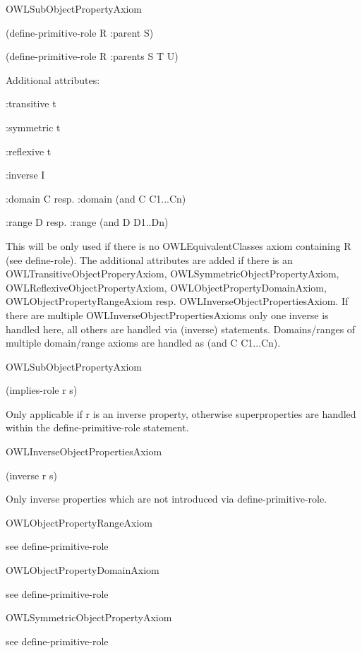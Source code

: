 O\-W\-L\-Sub\-Object\-Property\-Axiom 

(define-\/primitive-\/role R \-:parent S)

(define-\/primitive-\/role R \-:parents S T U)

Additional attributes\-: 
\begin{DoxyItemize}
\item \-:transitive t 
\item \-:symmetric t 
\item \-:reflexive t 
\item \-:inverse I 
\item \-:domain C resp. \-:domain (and C C1...Cn) 
\item \-:range D resp. \-:range (and D D1..Dn) 
\end{DoxyItemize}

This will be only used if there is no O\-W\-L\-Equivalent\-Classes axiom containing R (see define-\/role). The additional attributes are added if there is an O\-W\-L\-Transitive\-Object\-Propery\-Axiom, O\-W\-L\-Symmetric\-Object\-Property\-Axiom, O\-W\-L\-Reflexive\-Object\-Property\-Axiom, O\-W\-L\-Object\-Property\-Domain\-Axiom, O\-W\-L\-Object\-Property\-Range\-Axiom resp. O\-W\-L\-Inverse\-Object\-Properties\-Axiom. If there are multiple O\-W\-L\-Inverse\-Object\-Properties\-Axioms only one inverse is handled here, all others are handled via (inverse) statements. Domains/ranges of multiple domain/range axioms are handled as (and C C1...Cn).   

O\-W\-L\-Sub\-Object\-Property\-Axiom 

(implies-\/role r s) 

Only applicable if r is an inverse property, otherwise superproperties are handled within the define-\/primitive-\/role statement.   

O\-W\-L\-Inverse\-Object\-Properties\-Axiom 

(inverse r s) 

Only inverse properties which are not introduced via define-\/primitive-\/role.   

O\-W\-L\-Object\-Property\-Range\-Axiom 

see define-\/primitive-\/role  

O\-W\-L\-Object\-Property\-Domain\-Axiom 

see define-\/primitive-\/role  

O\-W\-L\-Symmetric\-Object\-Property\-Axiom 

see define-\/primitive-\/role  

